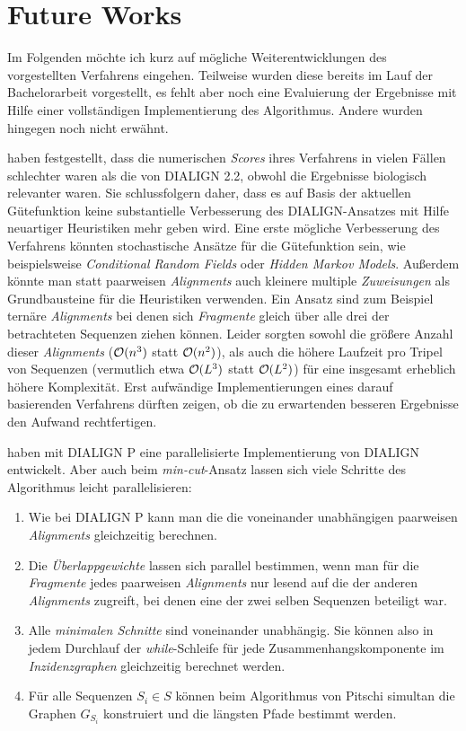 \section{Future Works} \label{sec:fut_work}

Im Folgenden möchte ich kurz auf mögliche Weiterentwicklungen des vorgestellten Verfahrens eingehen. Teilweise wurden diese bereits im Lauf der Bachelorarbeit vorgestellt, es fehlt aber noch eine Evaluierung der Ergebnisse mit Hilfe einer vollständigen Implementierung des Algorithmus. Andere wurden hingegen noch nicht erwähnt.

\cite{cpm10} haben festgestellt, dass die numerischen \emph{Scores} ihres Verfahrens in vielen Fällen schlechter waren als die von DIALIGN 2.2, obwohl die Ergebnisse biologisch relevanter waren. Sie schlussfolgern daher, dass es auf Basis der aktuellen Gütefunktion keine substantielle Verbesserung des DIALIGN-Ansatzes mit Hilfe neuartiger Heuristiken mehr geben wird. Eine erste mögliche Verbesserung des Verfahrens könnten stochastische Ansätze für die Gütefunktion sein, wie beispielsweise \emph{Conditional Random Fields} oder \emph{Hidden Markov Models}. Außerdem könnte man statt paarweisen \emph{Alignments} auch kleinere multiple \emph{Zuweisungen} als Grundbausteine für die Heuristiken verwenden. Ein Ansatz sind zum Beispiel ternäre \emph{Alignments} bei denen sich \emph{Fragmente} gleich über alle drei der betrachteten Sequenzen ziehen können. Leider sorgten sowohl die größere Anzahl dieser \emph{Alignments} ($\mathcal{O}(n^3)$ statt $\mathcal{O}(n^2)$), als auch die höhere Laufzeit pro Tripel von Sequenzen (vermutlich etwa $\mathcal{O}(L^3)$ statt $\mathcal{O}(L^2)$) für eine insgesamt erheblich höhere Komplexität. Erst aufwändige Implementierungen eines darauf basierenden Verfahrens dürften zeigen, ob die zu erwartenden besseren Ergebnisse den Aufwand rechtfertigen.

\cite{snkm04} haben mit DIALIGN P eine parallelisierte Implementierung von DIALIGN entwickelt. Aber auch beim \emph{min-cut}-Ansatz lassen sich viele Schritte des Algorithmus leicht parallelisieren:

\begin{enumerate}[topsep=0pt,itemsep=-1ex,partopsep=1ex,parsep=1ex]
	\item Wie bei DIALIGN P kann man die die voneinander unabhängigen paarweisen \emph{Alignments} gleichzeitig berechnen.
	\item Die \emph{Überlappgewichte} lassen sich parallel bestimmen, wenn man für die \emph{Fragmente} jedes paarweisen \emph{Alignments} nur lesend auf die der anderen \emph{Alignments} zugreift, bei denen eine der zwei selben Sequenzen beteiligt war.
	\item Alle \emph{minimalen Schnitte} sind voneinander unabhängig. Sie können also in jedem Durchlauf der \emph{while}-Schleife für jede Zusammenhangskomponente im \emph{Inzidenzgraphen} gleichzeitig berechnet werden.
	\item Für alle Sequenzen $S_i \in S$ können beim Algorithmus von Pitschi simultan die Graphen $G_{S_i}$ konstruiert und die längsten Pfade bestimmt werden.
\end{enumerate}

